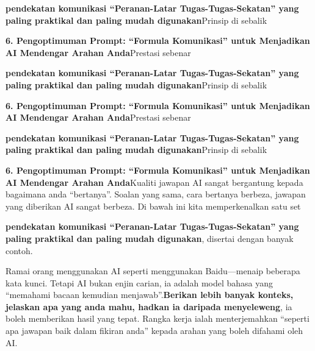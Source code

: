\textbf{pendekatan komunikasi “Peranan-Latar Tugas-Tugas-Sekatan” yang paling praktikal dan paling mudah digunakan}Prinsip di sebalik


\textbf{6. Pengoptimuman Prompt: “Formula Komunikasi” untuk Menjadikan AI Mendengar Arahan Anda}Prestasi sebenar

\textbf{pendekatan komunikasi “Peranan-Latar Tugas-Tugas-Sekatan” yang paling praktikal dan paling mudah digunakan}Prinsip di sebalik


\textbf{6. Pengoptimuman Prompt: “Formula Komunikasi” untuk Menjadikan AI Mendengar Arahan Anda}Prestasi sebenar

\textbf{pendekatan komunikasi “Peranan-Latar Tugas-Tugas-Sekatan” yang paling praktikal dan paling mudah digunakan}Prinsip di sebalik


\textbf{6. Pengoptimuman Prompt: “Formula Komunikasi” untuk Menjadikan AI Mendengar Arahan Anda}Kualiti jawapan AI sangat bergantung kepada bagaimana anda “bertanya”. Soalan yang sama, cara bertanya berbeza, jawapan yang diberikan AI sangat berbeza. Di bawah ini kita memperkenalkan satu set

\textbf{pendekatan komunikasi “Peranan-Latar Tugas-Tugas-Sekatan” yang paling praktikal dan paling mudah digunakan}, disertai dengan banyak contoh.


Ramai orang menggunakan AI seperti menggunakan Baidu—menaip beberapa kata kunci. Tetapi AI bukan enjin carian, ia adalah model bahasa yang “memahami bacaan kemudian menjawab”.\textbf{Berikan lebih banyak konteks, jelaskan apa yang anda mahu, hadkan ia daripada menyeleweng}, ia boleh memberikan hasil yang tepat. Rangka kerja ialah menterjemahkan “seperti apa jawapan baik dalam fikiran anda” kepada arahan yang boleh difahami oleh AI.

